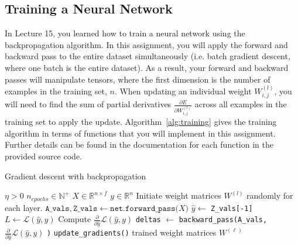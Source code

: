 \documentclass[12pt]{article}
\begin{document}
\subsection{Training a Neural Network}

In Lecture 15, you learned how to train a neural network using the backpropagation algorithm. In this assignment, you will apply the forward and backward pass to the entire dataset simultaneously (i.e. batch gradient descent, where one batch is the entire dataset). As a result, your forward and backward passes will manipulate tensors, where the first dimension is the number of examples in the training set, $n$. When updating an individual weight $W^{(l)}_{i,j}$, you will need to find the sum of partial derivatives $\frac{\partial E}{\partial W^{(l)}_{i,j}}$ across all examples in the training set to apply the update. Algorithm~\ref{alg:training} gives the training algorithm in terms of functions that you will implement in this assignment. Further details can be found in the documentation for each function in the provided source code.

\begin{algorithm}[ht!]
\caption{Gradient descent with backpropagation}
\label{alg:training}
    \begin{algorithmic}
        \Require $\eta > 0$ 
        \Require $n_{epochs} \in \mathbb{N}^+$ 
        \Require $X \in \mathbb{R}^{n \times f}$ 
        \Require $y \in \mathbb{R}^{n}$ 
        \State Initiate weight matrices $W^{(l)}$ randomly for each layer.  
         
            \State $\texttt{A\_vals}, \texttt{Z\_vals} \gets \texttt{net.forward\_pass(}X\texttt{)}$ 
            \State $\hat{y} \gets$ \texttt{Z\_vals[-1]} 
            \State $L \gets \mathcal{L}(\hat{y}, y)$
            \State Compute $\frac{\partial }{\partial \hat{y}} \mathcal{L}(\hat{y}, y)$ 
            \State \texttt{deltas} $\gets$ \texttt{backward\_pass(A\_vals,} $\frac{\partial }{\partial \hat{y}} \mathcal{L}(\hat{y}, y)$ \texttt{)} 
            \State \texttt{update\_gradients()} 
        \EndFor
        \State \Return trained weight matrices $W^{(\ell)}$
    \end{algorithmic}
\end{algorithm}
\end{document}
